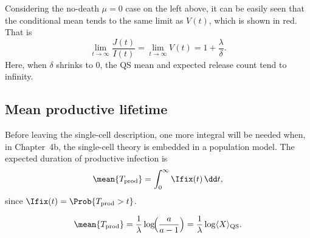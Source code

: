 
Considering the no-death $\mu = 0$ case on the left above, it can be easily
seen that the conditional mean tends to the same limit as $V(t)$, which is
shown in red. That is
$$\lim_{t\to\infty}     \frac{J(t)}{I(t)}     =    \lim_{t\to\infty} V(t)  = 1 + \frac{\lambda}{\delta}.$$
Here, when $\delta$ shrinks to $0$, the QS mean and expected release count
tend to infinity.

\subsection{Mean productive lifetime}
\label{sec:lifetime}

Before leaving the single-cell description, one more integral will be needed
when, in Chapter~4b, the single-cell theory is embedded in a population
model. The expected duration of productive infection is
\begin{equation}
\mean{T_{\rm prod}}=\int_0^\infty\Ifix(t)\,\dd t,
\end{equation}
since $\Ifix(t)=\Prob{T_{\rm prod}>t}$.

\begin{proposition}
\label{prop:lifetime}
\begin{equation}
\mean{T_{\rm prod}}
=\frac{1}{\lambda}\log\!\Bigl(\frac{a}{a-1}\Bigr)
=\frac{1}{\lambda}\log\langle X\rangle_{\rm QS}.
\end{equation}
\end{proposition}

